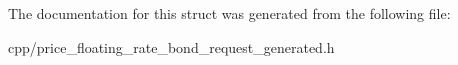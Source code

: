 The documentation for this struct was generated from the following file\+:\begin{DoxyCompactItemize}
\item 
cpp/price\+\_\+floating\+\_\+rate\+\_\+bond\+\_\+request\+\_\+generated.\+h\end{DoxyCompactItemize}
